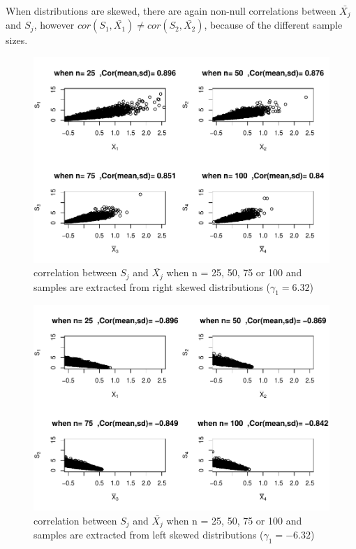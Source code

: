 \documentclass[
  english,
  man]{apa6}
\begin{document}
When distributions are skewed, there are again non-null correlations between \(\bar{X_j}\) and \(S_j\), however \(cor(S_1,\bar{X_1}) \neq cor(S_2,\bar{X_2})\), because of the different sample sizes.

\begin{figure}
\centering
\includegraphics{Correlation_files/figure-latex/Homunbalcorasafctofn1-1.pdf}
\caption{\label{fig:Homunbalcorasafctofn1}correlation between \(S_j\) and \(\bar{X_j}\) when n = 25, 50, 75 or 100 and samples are extracted from right skewed distributions (\(\gamma_1 = 6.32\))}
\end{figure}

\begin{figure}
\centering
\includegraphics{Correlation_files/figure-latex/Homunbalcorasafctofn2-1.pdf}
\caption{\label{fig:Homunbalcorasafctofn2}correlation between \(S_j\) and \(\bar{X_j}\) when n = 25, 50, 75 or 100 and samples are extracted from left skewed distributions (\(\gamma_1 = -6.32\))}
\end{figure}
\end{document}

